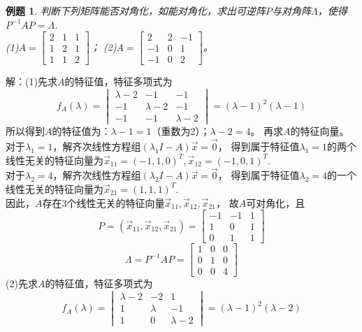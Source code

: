 \documentclass[a4paper]{book}
\newtheorem{eg}{例题}[chapter]
\begin{document}
\begin{eg}
判断下列矩阵能否对角化，如能对角化，求出可逆阵$P$与对角阵$\Lambda$，使得
$P^{-1}AP=\Lambda$.\\
(1)$A=\begin{bmatrix}2&1&1\\1&2&1\\1&1&2\end{bmatrix}$；
(2)$A=\begin{bmatrix}2&2&-1\\-1&0&1\\-1&0&2\end{bmatrix}$。
\end{eg}
解：(1)先求$A$的特征值，特征多项式为
\begin{equation*}
f_A(\lambda)=
\begin{vmatrix}\lambda-2&-1&-1\\-1&\lambda-2&-1\\-1&-1&\lambda-2\end{vmatrix}
=(\lambda-1)^2(\lambda-1)
\end{equation*}
所以得到$A$的特征值为：$\lambda-1=1$（重数为2）；$\lambda-2=4$。
再求$A$的特征向量。\\
对于$\lambda_1=1$，解齐次线性方程组$(\lambda_1 I-A)\vec{x}=\vec{0}$，
得到属于特征值$\lambda_1=1$的两个线性无关的特征向量为$\vec{x}_{11}=(-1,1,0)^T,\vec{x}_{12}=(-1,0,1)^T$.\\
对于$\lambda_2=4$，解齐次线性方程组$(\lambda_2 I-A)\vec{x}=\vec{0}$，
得到属于特征值$\lambda_2=4$的一个线性无关的特征向量为$\vec{x}_{21}=(1,1,1)^T$.\\
因此，$A$存在3个线性无关的特征向量$\vec{x}_{11},\vec{x}_{12},\vec{x}_{21}$，
故$A$可对角化，且
\begin{equation*}
P=(\vec{x}_{11},\vec{x}_{12},\vec{x}_{21})=\begin{bmatrix}-1&-1&1\\1&0&1\\0&1&1
\end{bmatrix}
\end{equation*}
\begin{equation*}
\Lambda=P^{-1}AP=\begin{bmatrix}1&0&0\\0&1&0\\0&0&4\end{bmatrix}
\end{equation*}
(2)先求$A$的特征值，特征多项式为
\begin{equation*}
f_A(\lambda)=
\begin{vmatrix}\lambda-2&-2&1\\1&\lambda&-1\\1&0&\lambda-2\end{vmatrix}
=(\lambda-1)^2(\lambda-2)
\end{equation*}
\end{document}
